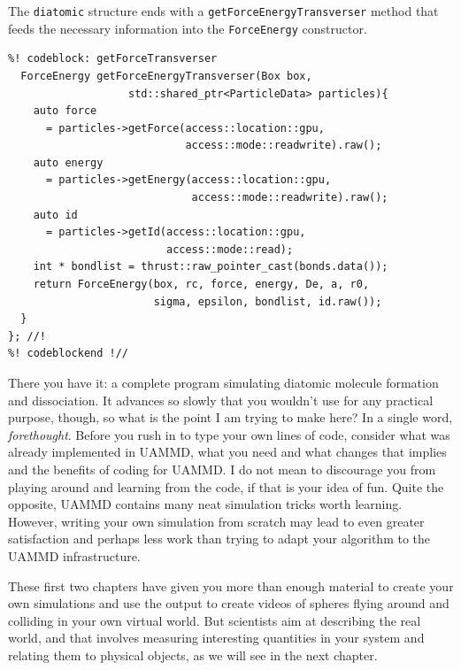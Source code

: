 The \texttt{diatomic} structure ends with a \texttt{getForceEnergyTransverser}
method that feeds the necessary information into the \texttt{ForceEnergy}
constructor.
\begin{lstlisting}
%! codeblock: getForceTransverser
  ForceEnergy getForceEnergyTransverser(Box box,
                   std::shared_ptr<ParticleData> particles){
    auto force
      = particles->getForce(access::location::gpu,
                            access::mode::readwrite).raw();
    auto energy
      = particles->getEnergy(access::location::gpu,
                             access::mode::readwrite).raw();
    auto id
      = particles->getId(access::location::gpu,
                         access::mode::read);
    int * bondlist = thrust::raw_pointer_cast(bonds.data());
    return ForceEnergy(box, rc, force, energy, De, a, r0,
                       sigma, epsilon, bondlist, id.raw());
  }
}; //!
%! codeblockend !//
\end{lstlisting}

There you have it: a complete program simulating diatomic molecule formation and 
dissociation. It advances so slowly that you wouldn't use for any practical 
purpose, though, so what is the point I am trying to make here? In a single 
word, \textit{forethought}. Before you rush in to type your own lines of code, 
consider what was already implemented in UAMMD, what you need and what changes 
that implies and the benefits of coding for UAMMD. I do not mean to discourage 
you from playing around and learning from the code, if that is your idea of fun. 
Quite the opposite, UAMMD contains many neat simulation tricks worth learning. 
However, writing your own simulation from scratch may lead to even greater 
satisfaction and perhaps less work than trying to adapt your algorithm to the 
UAMMD infrastructure.

\bigbreak

These first two chapters have given you more than enough material to create your 
own simulations and use the output to create videos of spheres flying around and 
colliding in your own virtual world. But scientists aim at describing the real 
world, and that involves measuring interesting quantities in your system and 
relating them to physical objects, as we will see in the next chapter.

